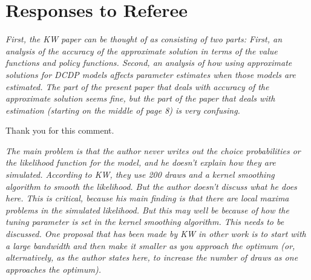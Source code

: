 \newpage\section*{Responses to Referee}\vspace{1.0cm}
\begin{boenumerate}
\item \textit{First, the KW paper can be thought of as consisting of two parts: First, an analysis of the accuracy of the approximate solution in terms of the value functions and policy functions. Second, an analysis of how using approximate solutions for DCDP models affects parameter estimates when those models are estimated. The part of the present paper that deals with
accuracy of the approximate solution seems fine, but the part of the paper that deals with estimation (starting on the middle of page 8) is very confusing.}\vspace{0.5cm}

Thank you for this comment.\vspace{0.50cm}
\item \textit{The main problem is that the author never writes out the choice probabilities or the likelihood function for the model, and he doesn't explain how they are simulated. According to KW, they use 200 draws and a kernel smoothing algorithm to smooth the likelihood. But the author doesn't discuss what he does here. This is critical, because his main finding is that there are local maxima problems in the simulated likelihood. But this may well be because of how the tuning parameter is set in the kernel smoothing algorithm. This needs to be discussed. One proposal that has been made by KW in other work is to start with a large bandwidth and then make it smaller as you approach the optimum (or, alternatively, as the author states here, to increase the number of draws as one approaches the optimum).}\vspace{0.5cm}


\end{boenumerate}

